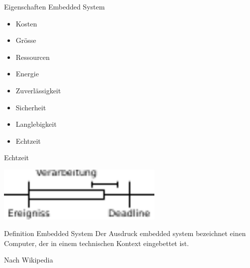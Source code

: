 \begin{frame}{Eigenschaften Embedded System}
	\pause
	\begin{multicols}{2}
		\begin{itemize}
			\item Kosten
			\item Grösse
			\item Ressourcen
			\item Energie
			\item Zuverlässigkeit
			\item Sicherheit
			\item Langlebigkeit
			\item Echtzeit
		\end{itemize}
	\end{multicols}
\end{frame}

\begin{frame}{Echtzeit}
	\begin{center}
		\includegraphics[width=8cm]{res/echtzeit.pdf}
	\end{center}
\end{frame}

\begin{frame}{Definition Embedded System}
	Der Ausdruck embedded system bezeichnet einen Computer, der in einem technischen Kontext eingebettet ist. 
	\begin{flushright}
		Nach Wikipedia
	\end{flushright}
\end{frame}


